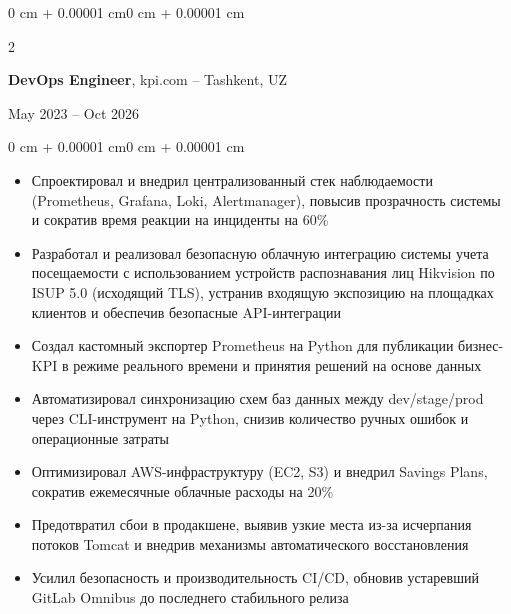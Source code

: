 \documentclass[10pt, letterpaper]{article}
\newenvironment{highlights}{
    \begin{itemize}[
        topsep=0.10 cm,
        parsep=0.10 cm,
        partopsep=0pt,
        itemsep=0pt,
        leftmargin=0 cm + 10pt
    ]
}{
    \end{itemize}
}
\newenvironment{onecolentry}{
    \begin{adjustwidth}{0 cm + 0.00001 cm}{0 cm + 0.00001 cm}
}{
    \end{adjustwidth}
}
\newenvironment{twocolentry}[2][]{
    \onecolentry
    \def\secondColumn{#2}
    \setcolumnwidth{\fill, 4.5 cm}
    \begin{paracol}{2}
}{
    \switchcolumn \raggedleft \secondColumn
    \end{paracol}
    \endonecolentry
}
\begin{document}
    \begin{twocolentry}{May 2023 -- Oct 2026}
        \textbf{DevOps Engineer}, kpi.com -- Tashkent, UZ
    \end{twocolentry}
    \vspace{0.10 cm}
    \begin{onecolentry}
        \begin{highlights}
            \item Спроектировал и внедрил централизованный стек наблюдаемости (Prometheus, Grafana, Loki, Alertmanager), повысив прозрачность системы и сократив время реакции на инциденты на 60\%
            \item Разработал и реализовал безопасную облачную интеграцию системы учета посещаемости с использованием устройств распознавания лиц Hikvision по ISUP 5.0 (исходящий TLS), устранив входящую экспозицию на площадках клиентов и обеспечив безопасные API-интеграции
            \item Создал кастомный экспортер Prometheus на Python для публикации бизнес-KPI в режиме реального времени и принятия решений на основе данных
            \item Автоматизировал синхронизацию схем баз данных между dev/stage/prod через CLI-инструмент на Python, снизив количество ручных ошибок и операционные затраты
            \item Оптимизировал AWS-инфраструктуру (EC2, S3) и внедрил Savings Plans, сократив ежемесячные облачные расходы на 20\%
            \item Предотвратил сбои в продакшене, выявив узкие места из-за исчерпания потоков Tomcat и внедрив механизмы автоматического восстановления
            \item Усилил безопасность и производительность CI/CD, обновив устаревший GitLab Omnibus до последнего стабильного релиза
        \end{highlights}
    \end{onecolentry}
    \vspace{0.20 cm}
    
\end{document}
